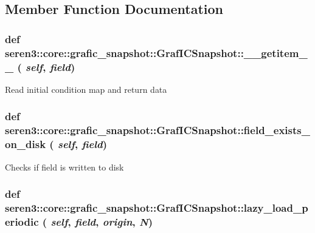 \subsection{Member Function Documentation}
\hypertarget{classseren3_1_1core_1_1grafic__snapshot_1_1GrafICSnapshot_a8a8630ab2ce317db7548e295b0d64d3d}{
\subsubsection[{\_\-\_\-getitem\_\-\_\-}]{\setlength{\rightskip}{0pt plus 5cm}def seren3::core::grafic\_\-snapshot::GrafICSnapshot::\_\-\_\-getitem\_\-\_\- ( {\em self}, \/   {\em field})}}
\label{classseren3_1_1core_1_1grafic__snapshot_1_1GrafICSnapshot_a8a8630ab2ce317db7548e295b0d64d3d}
\begin{DoxyVerb}
Read initial condition map and return data
\end{DoxyVerb}
 \hypertarget{classseren3_1_1core_1_1grafic__snapshot_1_1GrafICSnapshot_af3a25d2951a2e8e6349eae67606a2fb5}{
\subsubsection[{field\_\-exists\_\-on\_\-disk}]{\setlength{\rightskip}{0pt plus 5cm}def seren3::core::grafic\_\-snapshot::GrafICSnapshot::field\_\-exists\_\-on\_\-disk ( {\em self}, \/   {\em field})}}
\label{classseren3_1_1core_1_1grafic__snapshot_1_1GrafICSnapshot_af3a25d2951a2e8e6349eae67606a2fb5}
\begin{DoxyVerb}
Checks if field is written to disk
\end{DoxyVerb}
 \hypertarget{classseren3_1_1core_1_1grafic__snapshot_1_1GrafICSnapshot_a4cc2a0f15619694e65c70c5cd56c3dd8}{
\subsubsection[{lazy\_\-load\_\-periodic}]{\setlength{\rightskip}{0pt plus 5cm}def seren3::core::grafic\_\-snapshot::GrafICSnapshot::lazy\_\-load\_\-periodic ( {\em self}, \/   {\em field}, \/   {\em origin}, \/   {\em N})}}
